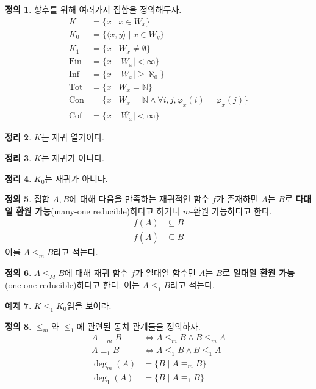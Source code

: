 \documentclass[b5paper, 11pt]{book}
\theoremstyle{definition}
\newtheorem{defn}{정의}[chapter]
\newtheorem{thm}[defn]{정리}
\newtheorem{ex}[defn]{예제}
\begin{document}
\begin{defn}\label{index set example}
    향후를 위해 여러가지 집합을 정의해두자.
    \begin{align*}
        K &= \{ x \;\vert\; x \in W_x \} \\ 
        K_0 &= \{ \langle x, y \rangle \;\vert\; x \in W_y \} \\       K_1 &= \{ x \;\vert\; W_x \neq \emptyset \} \\ 
        \mathrm{Fin} &= \{ x \;\vert\; \vert W_x \vert < \infty \} \\ 
        \mathrm{Inf} &= \{ x \;\vert\; \vert W_x \vert \ge \aleph_0 \} \\ 
        \mathrm{Tot} &= \{ x \;\vert\; W_x = \mathbb{N} \} \\ 
        \mathrm{Con} &= \{ x \;\vert\; W_x = \mathbb{N} \wedge \forall i, j, \varphi_x (i) = \varphi_ x (j) \} \\
        \mathrm{Cof} &= \{x \;\vert\; \vert \overline{W_x}\vert < \infty \}
    \end{align*}
\end{defn}
\begin{thm}
    $K$는 재귀 열거이다.
\end{thm}
\begin{thm}
    $K$는 재귀가 아니다.
\end{thm}
\begin{thm}
    $K_0$는 재귀가 아니다.
\end{thm}
\begin{defn}
    집합 $A, B$에 대해 다음을 만족하는 재귀적인 함수 $f$가 존재하면 $A$는 $B$로 \textbf{다대일 환원 가능}(many-one reducible)하다고 하거나 $m$-환원 가능하다고 한다.
    \begin{align*}
        f(A) &\subseteq B \\ 
        f(\overline{A}) &\subseteq \overline{B}
    \end{align*}
    이를 $A \le_m B$라고 적는다.
\end{defn}
\begin{defn}
    $A \le_M B$에 대해 재귀 함수 $f$가 일대일 함수면 $A$는 $B$로 \textbf{일대일 환원 가능}(one-one reducible)하다고 한다. 이는 $A \le_1 B$라고 적는다.
\end{defn}
\begin{ex}
    $K \le_1 K_0$임을 보여라.
\end{ex}
\begin{defn}
    $\le_m$와 $\le_1$에 관련된 동치 관계들을 정의하자.
    \begin{align*}
        A \equiv_m B &\Leftrightarrow A \le_m B \wedge B \le_m A \\ 
        A \equiv_1 B &\Leftrightarrow A \le_1 B \wedge B \le_1 A \\ 
        \deg_m (A) &= \{ B \;\vert\; A \equiv_m B\} \\ 
        \deg_1 (A) &= \{ B \;\vert\; A \equiv_1 B\} 
    \end{align*}
\end{defn}
\end{document}
